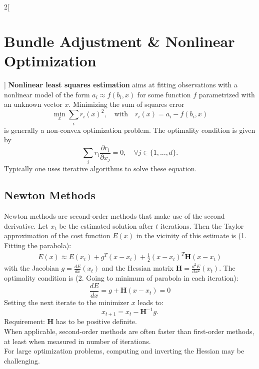 \documentclass[oneside,fontsize=11pt,paper=a4]{scrartcl}
\begin{document}
\begin{multicols}{2}[\section{Bundle Adjustment \& Nonlinear Optimization}]
\textbf{Nonlinear least squares estimation} aims at fitting observations with a nonlinear model of the form $a_i \approx f(b_i, x)$ for some function $f$ parametrized with an unknown vector $x$.
Minimizing the sum of squares error
\begin{equation*}
    \min_{x} \sum_i r_i (x)^2, \quad \text{with} \quad r_i(x)=a_i-f(b_i,x)
\end{equation*}
is generally a non-convex optimization problem. The optimality condition is given by
\begin{equation*}
    \sum_i r_i \frac{\partial r_i}{\partial x_j} = 0, \quad \forall j \in \{1,...,d\}.
\end{equation*}
Typically one uses iterative algorithms to solve these equation.


\subsection{Newton Methods}
Newton methods are second-order methods that make use of the second derivative.
Let $x_t$ be the estimated solution after $t$ iterations.
Then the Taylor approximation of the cost function $E(x)$ in the vicinity of this estimate is (1. Fitting the parabola):
\begin{equation*}
\begin{split}
    E(x) \approx E(x_t) + g^T (x-x_t) + \frac{1}{2} (x-x_t)^T \boldsymbol{H} (x-x_t)
\end{split}
\end{equation*}
with the Jacobian $g = \frac{dE}{dx}(x_t)$ and the Hessian matrix $\boldsymbol{H} = \frac{d^2E}{dx^2}(x_t)$.
The optimality condition is (2. Going to minimum of parabola in each iteration):
\begin{equation*}
    \frac{dE}{dx} = g + \boldsymbol{H} (x-x_t) = 0
\end{equation*}
Setting the next iterate to the minimizer $x$ leads to:
\begin{equation*}
    x_{t+1} = x_t - \boldsymbol{H}^{-1} g.
\end{equation*}
Requirement: $\boldsymbol{H}$ has to be positive definite.\\
When applicable, second-order methods are often faster than first-order methods, at least when measured in number of iterations.\\
For large optimization problems, computing and inverting the Hessian may be challenging.



\end{multicols}
\end{document}
